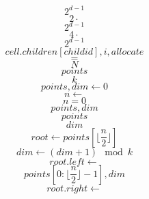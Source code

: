 \documentclass{scrreprt}
\begin{document}
\begin{equation}
2^{d-1}
\end{equation}
\begin{equation}
2\cdot
\end{equation}
\begin{equation}
2^{d-1}
\end{equation}
\begin{equation}
4\cdot
\end{equation}
\begin{equation}
2^{d-1}
\end{equation}
\begin{equation}
cell.children[childid], i, allocate
\end{equation}
\begin{equation}
=
\end{equation}
\begin{equation}
N
\end{equation}
\begin{equation}
points
\end{equation}
\begin{equation}
k
\end{equation}
\begin{equation}
points, dim\gets0
\end{equation}
\begin{equation}
n\gets
\end{equation}
\begin{equation}
n=0
\end{equation}
\begin{equation}
points, dim
\end{equation}
\begin{equation}
points
\end{equation}
\begin{equation}
dim
\end{equation}
\begin{equation}
root\gets{}points\left[\lfloor\frac{n}{2}\rfloor\right]
\end{equation}
\begin{equation}
dim\gets(dim+1)\mod{k}
\end{equation}
\begin{equation}
root.left \gets
\end{equation}
\begin{equation}
points\left[0:\lfloor\frac{n}{2}\rfloor-1\right], dim
\end{equation}
\begin{equation}
root.right \gets
\end{equation}
\end{document}
